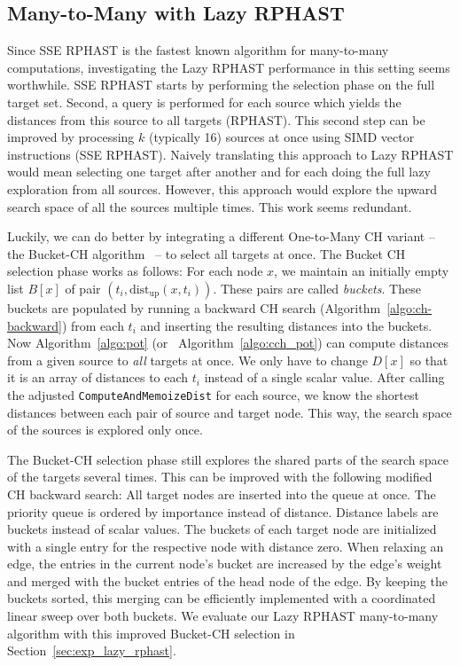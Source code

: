\documentclass[manuscript,review]{acmart}
\begin{document}
\subsection{Many-to-Many with Lazy RPHAST}

Since SSE RPHAST is the fastest known algorithm for many-to-many computations, investigating the Lazy RPHAST performance in this setting seems worthwhile.
SSE RPHAST starts by performing the selection phase on the full target set.
Second, a query is performed for each source which yields the distances from this source to all targets (RPHAST).
This second step can be improved by processing $k$ (typically 16) sources at once using SIMD vector instructions (SSE RPHAST).
Naively translating this approach to Lazy RPHAST would mean selecting one target after another and for each doing the full lazy exploration from all sources.
However, this approach would explore the upward search space of all the sources multiple times.
This work seems redundant.

Luckily, we can do better by integrating a different One-to-Many CH variant -- the Bucket-CH algorithm~\cite{gssv-erlrn-12} -- to select all targets at once.
The Bucket CH selection phase works as follows:
For each node $x$, we maintain an initially empty list $B[x]$ of pair $(t_i, \textrm{dist}_{\textrm{up}}(x,t_i))$. 
These pairs are called \emph{buckets}.
These buckets are populated by running a backward CH search (Algorithm~\ref{algo:ch-backward}) from each $t_i$ and inserting the resulting distances into the buckets.
Now Algorithm~\ref{algo:pot} (or~ Algorithm~\ref{algo:cch_pot}) can compute distances from a given source to \emph{all} targets at once.
We only have to change $D[x]$ so that it is an array of distances to each $t_i$ instead of a single scalar value.
After calling the adjusted \texttt{ComputeAndMemoizeDist} for each source, we know the shortest distances between each pair of source and target node.
This way, the search space of the sources is explored only once.

The Bucket-CH selection phase still explores the shared parts of the search space of the targets several times.
This can be improved with the following modified CH backward search:
All target nodes are inserted into the queue at once.
The priority queue is ordered by importance instead of distance.
Distance labels are buckets instead of scalar values.
The buckets of each target node are initialized with a single entry for the respective node with distance zero.
When relaxing an edge, the entries in the current node's bucket are increased by the edge's weight and merged with the bucket entries of the head node of the edge.
By keeping the buckets sorted, this merging can be efficiently implemented with a coordinated linear sweep over both buckets.
We evaluate our Lazy RPHAST many-to-many algorithm with this improved Bucket-CH selection in Section~\ref{sec:exp_lazy_rphast}.
\end{document}
